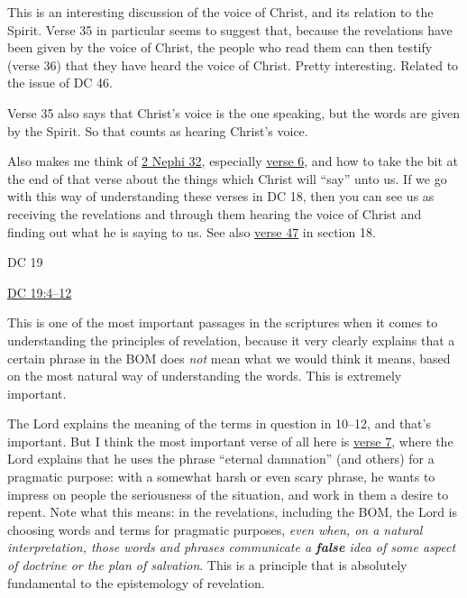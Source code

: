 \begin{compactdesc}
\begin{compactitem}
						\begin{compactitem}
							\item This is an interesting discussion of the voice of Christ, and its relation to the Spirit. Verse 35 in particular seems to suggest that, because the revelations have been given by the voice of Christ, the people who read them can then testify (verse 36) that they have heard the voice of Christ. Pretty interesting. Related to the issue of DC 46.
							\item Verse 35 also says that Christ's voice is the one speaking, but the words are given by the Spirit. So that counts as hearing Christ's voice.
							\item Also makes me think of \hyperref[2NEPHI-32]{2 Nephi 32}, especially \hyperref[2NEPHI-32-6]{verse 6}, and how to take the bit at the end of that verse about the things which Christ will ``say'' unto us. If we go with this way of understanding these verses in DC 18, then you can see us as receiving the revelations and through them hearing the voice of Christ and finding out what he is saying to us. See also \hyperref[DC18-47]{verse 47} in section 18.
						\end{compactitem}
				\end{compactitem}
			\item DC 19
				\begin{compactitem}
					\item \hyperref[DC19-4]{DC 19:4--12}
						\begin{compactitem}
							\item This is one of the most important passages in the scriptures when it comes to understanding the principles of revelation, because it very clearly explains that a certain phrase in the BOM does \textit{not} mean what we would think it means, based on the most natural way of understanding the words. This is extremely important.
							\item The Lord explains the meaning of the terms in question in 10--12, and that's important. But I think the most important verse of all here is \hyperref[DC19-7]{verse 7}, where the Lord explains that he uses the phrase ``eternal damnation'' (and others) for a pragmatic purpose: with a somewhat harsh or even scary phrase, he wants to impress on people the seriousness of the situation, and work in them a desire to repent. Note what this means: in the revelations, including the BOM, the Lord is choosing words and terms for pragmatic purposes, \textit{even when, on a natural interpretation, those words and phrases communicate a \textbf{false} idea of some aspect of doctrine or the plan of salvation}. This is a principle that is absolutely fundamental to the epistemology of revelation.

\end{compactitem}
\end{compactitem}
\end{compactdesc}
